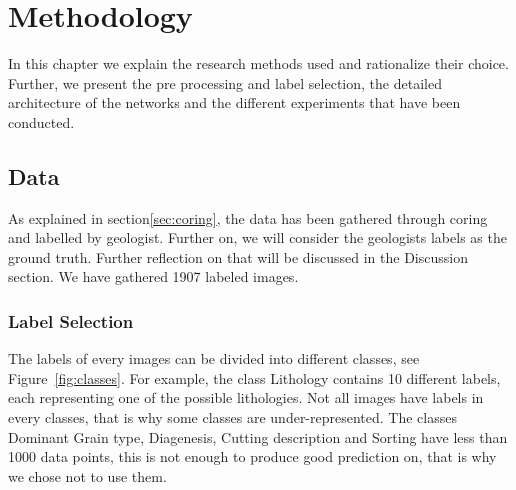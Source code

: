 \chapter{Methodology}\label{chp:methodology}
In this chapter we explain the research methods used and rationalize their choice. Further, we present the pre processing and label selection, the detailed architecture of the networks and the different experiments that have been conducted. 
\section{Data}

As explained in section\ref{sec:coring}, the data has been gathered through coring and labelled by geologist. Further on, we will consider the geologists labels as the ground truth. Further reflection on that will be discussed in the Discussion section. We have gathered 1907 labeled images. 
\subsection{Label Selection}
 The labels of every images can be divided into different classes, see Figure~\ref{fig:classes}. For example, the class Lithology contains 10 different labels, each representing one of the possible lithologies. Not all images have labels in every classes, that is why some classes are under-represented. The classes Dominant Grain type, Diagenesis, Cutting description and Sorting have less than 1000 data points, this is not enough to produce good prediction on, that is why we chose not to use them.
 
